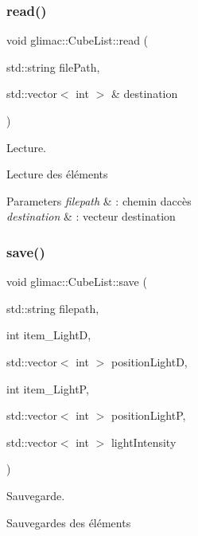 \subsubsection{\texorpdfstring{read()}{read()}}
{\footnotesize\ttfamily void glimac\+::\+Cube\+List\+::read (\begin{DoxyParamCaption}\item[{std\+::string}]{file\+Path,  }\item[{std\+::vector$<$ int $>$ \&}]{destination }\end{DoxyParamCaption})}



Lecture. 

Lecture des éléments


\begin{DoxyParams}{Parameters}
{\em filepath} & \+: chemin d\textquotesingle{}accès \\
\hline
{\em destination} & \+: vecteur destination \\
\hline
\end{DoxyParams}
\mbox{\label{classglimac_1_1CubeList_a2224458162725108e1451f76c2fc8aac}} 
\subsubsection{\texorpdfstring{save()}{save()}}
{\footnotesize\ttfamily void glimac\+::\+Cube\+List\+::save (\begin{DoxyParamCaption}\item[{std\+::string}]{filepath,  }\item[{int}]{item\+\_\+\+LightD,  }\item[{std\+::vector$<$ int $>$}]{position\+LightD,  }\item[{int}]{item\+\_\+\+LightP,  }\item[{std\+::vector$<$ int $>$}]{position\+LightP,  }\item[{std\+::vector$<$ int $>$}]{light\+Intensity }\end{DoxyParamCaption})}



Sauvegarde. 

Sauvegardes des éléments



